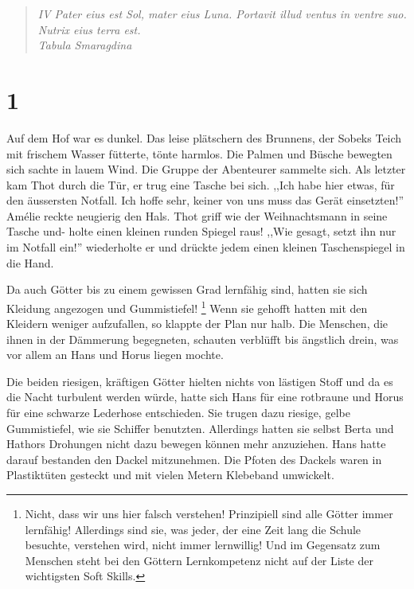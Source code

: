 \documentclass[11pt,titlepage,a5paper]{book}
\begin{document}
\begin{quotation}

\emph{IV Pater eius est Sol, mater eius Luna. Portavit illud ventus in ventre suo. Nutrix eius terra est. \\Tabula Smaragdina}

\end{quotation}



\section*{1}

Auf dem Hof war es dunkel. Das leise plätschern des Brunnens, der Sobeks Teich mit frischem Wasser fütterte, tönte harmlos. Die Palmen und Büsche bewegten sich sachte in lauem Wind. Die Gruppe der Abenteurer sammelte sich. Als letzter kam Thot durch die Tür, er trug eine Tasche bei sich. ,,Ich habe hier etwas, für den äussersten Notfall. Ich hoffe sehr, keiner von uns muss das Gerät einsetzten!'' Amélie reckte neugierig den Hals. Thot griff wie der Weihnachtsmann in seine Tasche und- holte einen kleinen runden Spiegel raus! ,,Wie gesagt, setzt ihn nur im Notfall ein!'' wiederholte er und drückte jedem einen kleinen Taschenspiegel in die Hand. 

Da auch Götter bis zu einem gewissen Grad lernfähig sind, hatten sie sich Kleidung angezogen und Gummistiefel! \footnote{Nicht, dass wir uns hier falsch verstehen! Prinzipiell sind alle Götter immer lernfähig! Allerdings sind sie, was jeder, der eine Zeit lang die Schule besuchte, verstehen wird, nicht immer lernwillig! Und im Gegensatz zum Menschen steht bei den Göttern Lernkompetenz nicht auf der Liste der wichtigsten Soft Skills.} Wenn sie gehofft hatten mit den Kleidern weniger aufzufallen, so klappte der Plan nur halb. Die Menschen, die ihnen in der Dämmerung begegneten, schauten verblüfft bis ängstlich drein, was vor allem an Hans und Horus liegen mochte.

Die beiden riesigen, kräftigen Götter hielten nichts von lästigen Stoff und da es die Nacht turbulent werden würde, hatte sich Hans für eine rotbraune und Horus für eine schwarze Lederhose entschieden. Sie trugen dazu riesige, gelbe Gummistiefel, wie sie Schiffer benutzten. Allerdings hatten sie selbst Berta und Hathors Drohungen nicht dazu bewegen können mehr anzuziehen. Hans hatte darauf bestanden den Dackel mitzunehmen. Die Pfoten des Dackels waren in Plastiktüten gesteckt und mit vielen Metern Klebeband umwickelt. 
\end{document}
